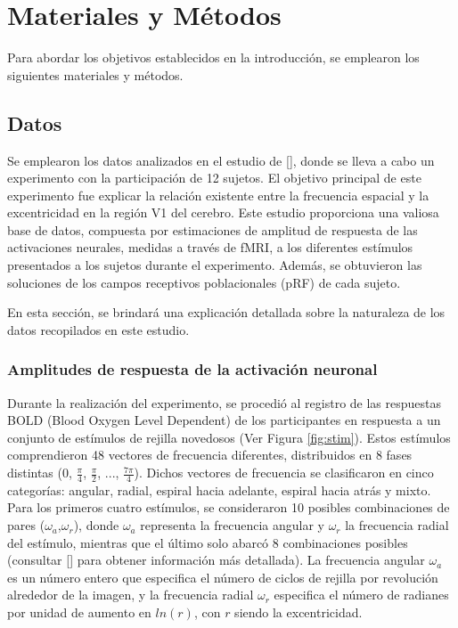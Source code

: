 \chapter{Materiales y M\'etodos}\label{chapter:materials_and_methods}

Para abordar los objetivos establecidos en la introducción, se emplearon los siguientes materiales y métodos.

\section{Datos}

Se emplearon los datos analizados en el estudio de [\cite{broderick_mapping_2022}], donde se lleva a cabo un experimento con la participación de 12 sujetos. El objetivo principal de este experimento fue explicar la relación existente entre la frecuencia espacial y la excentricidad en la región V1 del cerebro. Este estudio proporciona una valiosa base de datos, compuesta por estimaciones de amplitud de respuesta de las activaciones neurales, medidas a trav\'es de fMRI, a los diferentes estímulos presentados a los sujetos durante el experimento. Además, se obtuvieron las soluciones de los campos receptivos poblacionales (pRF) de cada sujeto.

En esta sección, se brindará una explicación detallada sobre la naturaleza de los datos recopilados en este estudio.

\subsection{Amplitudes de respuesta de la activaci\'on neuronal}

Durante la realización del experimento, se procedió al registro de las respuestas BOLD (Blood Oxygen Level Dependent) de los participantes en respuesta a un conjunto de est\'imulos de rejilla novedosos (Ver Figura \ref{fig:stim}). Estos estímulos comprendieron 48 vectores de frecuencia diferentes, distribuidos en 8 fases distintas (0, $\frac{\pi}{4}$, $\frac{\pi}{2}$, ..., $\frac{7\pi}{4}$). Dichos vectores de frecuencia se clasificaron en cinco categorías: angular, radial, espiral hacia adelante, espiral hacia atrás y mixto. Para los primeros cuatro estímulos, se consideraron 10 posibles combinaciones de pares ($\omega_a$,$\omega_r$), donde $\omega_a$ representa la frecuencia angular y $\omega_r$ la frecuencia radial del estímulo, mientras que el último solo abarcó 8 combinaciones posibles (consultar [\cite{broderick_mapping_2022}] para obtener información más detallada). La frecuencia angular $\omega_a$ es un número entero que especifica el número de ciclos de rejilla por revolución alrededor de la imagen, y la frecuencia radial $\omega_r$ especifica el número de radianes por unidad de aumento en $ln(r)$, con $r$ siendo la excentricidad.

